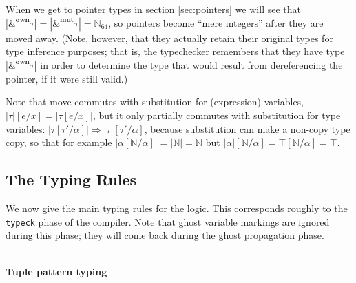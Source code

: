 \documentclass[acmsmall,nonacm]{acmart}
\DeclareMathOperator*{\Sep}{\scalerel*{\ast}{\sum}}
\newcommand*{\N}{\mathbb{N}}
\newcommand{\core}[1]{\left| #1 \right|}
\newcommand{\proves}{\vdash}
\newcommand{\judgment}[2][]{\noindent\\\textbf{#1}\hspace{\stretch{1}}\fbox{$#2$}\nopagebreak}
\newcommand*{\axiom}[2][]{\infer[#1]{}{#2}}
\begin{document}
When we get to pointer types in section \ref{sec:pointers} we will see that $\core{\&^\mathbf{own}\tau}=\core{\&^\mathbf{mut}\tau}=\N_{64}$, so pointers become ``mere integers'' after they are moved away. (Note, however, that they actually retain their original types for type inference purposes; that is, the typechecker remembers that they have type $\core{\&^\mathbf{own}\tau}$ in order to determine the type that would result from dereferencing the pointer, if it were still valid.)

Note that move commutes with substitution for (expression) variables, $\core{\tau}[e/x]=\core{\tau[e/x]}$, but it only partially commutes with substitution for type variables: $\core{\tau[\tau'/\alpha]}\Rightarrow\core{\tau}[\tau'/\alpha]$, because substitution can make a non-copy type copy, so that for example $\core{\alpha[\N/\alpha]}=\core{\N}=\N$ but $\core{\alpha}[\N/\alpha]=\top[\N/\alpha]=\top$.

\subsection{The Typing Rules}

We now give the main typing rules for the logic. This corresponds roughly to the \texttt{typeck} phase of the compiler. Note that ghost variable markings are ignored during this phase; they will come back during the ghost propagation phase.

\judgment[Tuple pattern typing]{\Gamma \proves t:\tau \Rightarrow \overline{R}}
\end{document}
